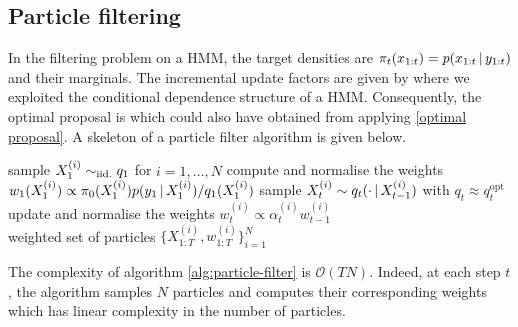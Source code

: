 \subsection{Particle filtering}
In the filtering problem on a HMM, the target densities are $\pi_{t}(x_{1:t})=p(x_{1:t}\,|\, y_{1:t})$ and their marginals. The incremental update factors are given by
where we exploited the conditional dependence structure of a HMM. Consequently, the optimal proposal is
which could also have obtained from applying \eqref{optimal proposal}. A skeleton of a particle filter algorithm is given below.
%
\begin{algorithm}[!h]\small
	\caption{\label{alg:particle-filter}}
	\begin{algorithmic}[1]
		\State sample $X_{1}^{(i)}\sim_{\mathrm{iid.}} q_{1}$ for $i=1,\dots,N$	%
		\State compute and normalise the weights $w_{1}(X^{(i)}_{1})\propto {\pi_{0}( X^{(i)}_{1})p(y_{1}\,|\,X^{(i)}_{1})/ q_{1}(X^{(i)}_{1})}$
			\State sample $X^{(i)}_{t}\sim q_{t}( \cdot \,|\, X^{(i)}_{t-1})$ with $q_{t}\approx q_{t}^{\text{opt}}$
			\State update and normalise the weights $w^{(i)}_{t}\propto\alpha^{(i)}_{t}w^{(i)}_{t-1}$
		\EndFor\\
		\Return weighted set of particles $\{X^{(i)}_{1:T},w^{(i)}_{1:T}\}_{i=1}^{N}$
	\end{algorithmic}
\end{algorithm}
%

The complexity of algorithm \ref{alg:particle-filter} is $\mathcal O(TN)$. Indeed, at each step $t$,  the algorithm samples $N$ particles and computes their corresponding weights which has linear complexity in the number of particles.

